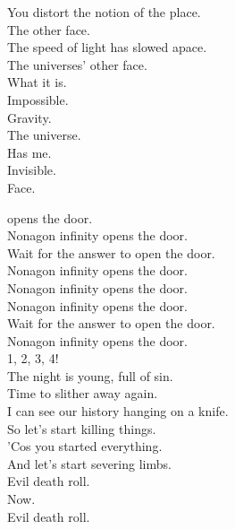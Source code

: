 
You distort the notion of the place. \\
The  other face. \\
The speed of light has slowed apace. \\
The universes' other face. \\

What it is. \\
Impossible. \\
Gravity. \\
The universe. \\
Has me. \\
Invisible. \\
Face. \\


 opens the door. \\
Nonagon infinity opens the door. \\
Wait for the answer to open the door. \\
Nonagon infinity opens the door. \\

Nonagon infinity opens the door. \\
Nonagon infinity opens the door. \\
Wait for the answer to open the door. \\
Nonagon infinity opens the door. \\

1, 2, 3, 4! \\

The night is young, full of sin. \\
Time to slither away again. \\
I can see our history hanging on a knife. \\

So let's start killing things. \\
'Cos you started everything. \\
And let's start severing limbs. \\

Evil death roll. \\
Now. \\
Evil death roll. \\



